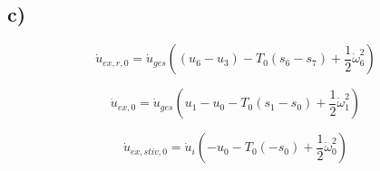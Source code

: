 

\subsection*{c)}

\[
\dot{u}_{ex,r,0} = \dot{u}_{ges}((u_6 - u_3) - T_0 (s_6 - s_7) + \frac{1}{2} \dot{\omega}_6^2)
\]

\[
\dot{u}_{ex,0} = \dot{u}_{ges}(u_1 - u_0 - T_0 (s_1 - s_0) + \frac{1}{2} \dot{\omega}_1^2)
\]

\[
\dot{u}_{ex,stiv,0} = \dot{u}_i (-u_0 - T_0 (-s_0) + \frac{1}{2} \dot{\omega}_0^2)
\]